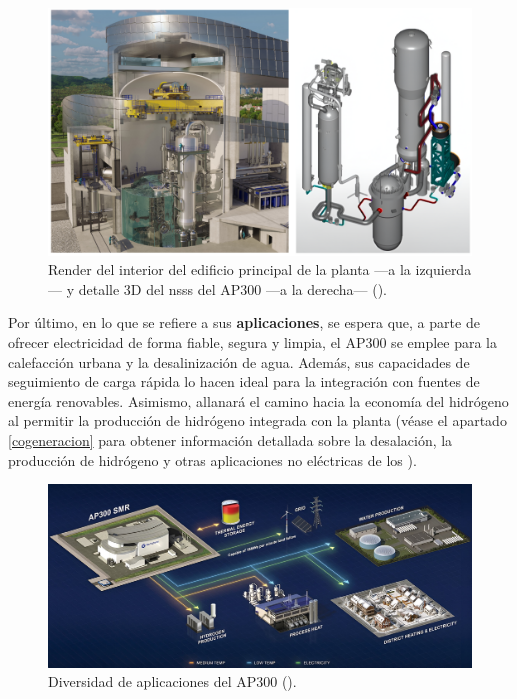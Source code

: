 \begin{figure}[h]
  \centering
  \includegraphics[width=\textwidth]{content/figures/ap300_inside_nsss.png}
  \caption{Render del interior del edificio principal de la planta ---a la izquierda--- y detalle 3D del \acrshort{nsss} del AP300 ---a la derecha--- (\cite{ap300_westinghouse}).}
  \label{fig:ap300_inside_nsss}
\end{figure}

 Por último, en lo que se refiere a sus \textbf{aplicaciones}, se espera que, a parte de ofrecer electricidad de forma fiable, segura y limpia, el AP300 se emplee para la calefacción urbana y la desalinización de agua. Además, sus capacidades de seguimiento de carga rápida lo hacen ideal para la integración con fuentes de energía renovables. Asimismo, allanará el camino hacia la economía del hidrógeno al permitir la producción de hidrógeno integrada con la planta (véase el apartado \ref{cogeneracion} para obtener información detallada sobre la desalación, la producción de hidrógeno y otras aplicaciones no eléctricas de los ).

 \begin{figure}[h]
  \centering
  \includegraphics[width=\textwidth]{content/figures/ap300_applications.jpeg}
  \caption{Diversidad de aplicaciones del AP300 (\cite{ap300_westinghouse}).}
  \label{fig:AP300_applications}
\end{figure}
